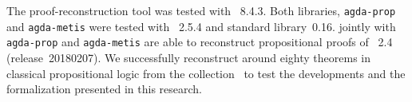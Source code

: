 \documentclass[../main.tex]{subfiles}
\begin{document}
The proof-reconstruction tool \Athena was tested with ~8.4.3.
Both libraries, \verb!agda-prop! and \verb!agda-metis! were tested with
\Agda~2.5.4 and \Agda standard library~0.16.
\Athena jointly with \verb!agda-prop! and \verb!agda-metis! are able
to reconstruct propositional proofs of \Metis~2.4 (release~20180207).
We successfully reconstruct around eighty theorems in classical propositional
logic from the \TPTP collection~\cite{Prieto-Cubides2017} to test
the developments and the formalization presented in this research.
\end{document}

